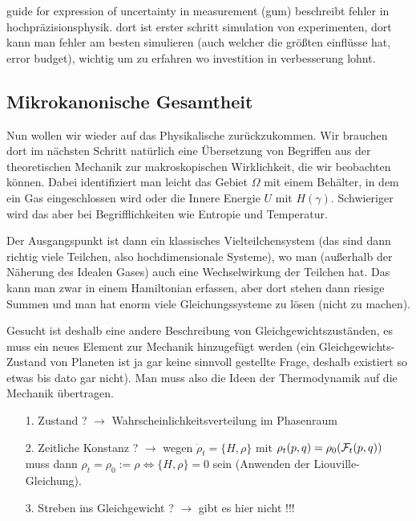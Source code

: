 \documentclass[../KlassMech_main.tex]{subfiles}
\begin{document}
guide for expression of uncertainty in measurement (gum) beschreibt fehler in hochpräzisionsphysik. dort ist erster schritt simulation von experimenten, dort kann man fehler am besten simulieren (auch welcher die größten einflüsse hat, error budget), wichtig um zu erfahren wo investition in verbesserung lohnt.



	\subsection{Mikrokanonische Gesamtheit}
Nun wollen wir wieder auf das Physikalische zurückzukommen. Wir brauchen dort im nächsten Schritt natürlich eine Übersetzung von Begriffen aus der theoretischen Mechanik zur makroskopischen Wirklichkeit, die wir beobachten können. Dabei identifiziert man leicht das Gebiet $\Omega$ mit einem Behälter, in dem ein Gas eingeschlossen wird oder die Innere Energie $U$ mit $H(\gamma)$. Schwieriger wird das aber bei Begrifflichkeiten wie Entropie und Temperatur.

Der Ausgangspunkt ist dann ein klassisches Vielteilchensystem (das sind dann richtig viele Teilchen, also hochdimensionale Systeme), wo man (außerhalb der Näherung des Idealen Gases) auch eine Wechselwirkung der Teilchen hat. Das kann man zwar in einem Hamiltonian erfassen, aber dort stehen dann riesige Summen und man hat enorm viele Gleichungssysteme zu lösen (nicht zu machen).

Gesucht ist deshalb eine andere Beschreibung von Gleichgewichtszuständen, es muss ein neues Element zur Mechanik hinzugefügt werden (ein Gleichgewichts-Zustand von Planeten ist ja gar keine sinnvoll gestellte Frage, deshalb existiert so etwas bis dato gar nicht). Man muss also die Ideen der Thermodynamik auf die Mechanik übertragen.

\begin{itemize}
\item[1.] Zustand ? $\rightarrow$ Wahrscheinlichkeitsverteilung im Phasenraum

\item[2.] Zeitliche Konstanz ? $\rightarrow$ wegen $\dot{\rho}_t = \{ H, \rho \}$ mit $\rho_t(p,q) = \rho_0\qty(\mathcal{F}_t(p,q))$ muss dann $\rho_t = \rho_0 := \rho \Leftrightarrow \{H, \rho\} = 0$ sein (Anwenden der Liouville-Gleichung).

\item[3.] Streben ins Gleichgewicht ? $\rightarrow$ gibt es hier nicht !!!
\end{itemize}
\end{document}
